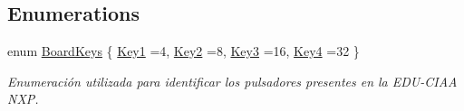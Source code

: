 \subsection*{Enumerations}
\begin{DoxyCompactItemize}
\item 
enum \hyperlink{group__operaciones_gac4035d04f315e3484218600aa1c52f44}{Board\+Keys} \{ \hyperlink{group__operaciones_ggac4035d04f315e3484218600aa1c52f44a5512d17c3218596367fffdc9bba5d772}{Key1} =4, 
\hyperlink{group__operaciones_ggac4035d04f315e3484218600aa1c52f44a4e2947c4588f93871e3321d6ed8b29ad}{Key2} =8, 
\hyperlink{group__operaciones_ggac4035d04f315e3484218600aa1c52f44ade464c5536012794d0bf75930adf611a}{Key3} =16, 
\hyperlink{group__operaciones_ggac4035d04f315e3484218600aa1c52f44aebb65f93ed25e808a5bfe10034f44e57}{Key4} =32
 \}\begin{DoxyCompactList}\small\item\em Enumeración utilizada para identificar los pulsadores presentes en la E\+D\+U-\/\+C\+I\+AA N\+XP. \end{DoxyCompactList}
\end{DoxyCompactItemize}
